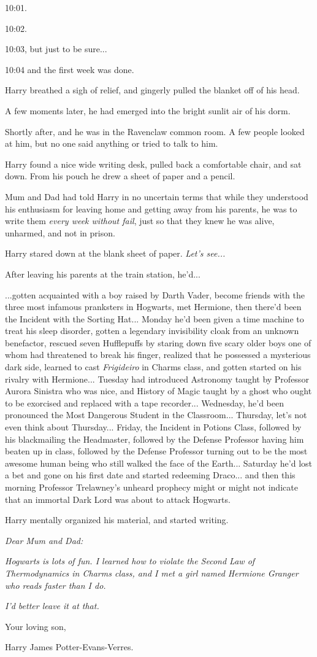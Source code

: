 10:01.

10:02.

10:03, but just to be sure...

10:04 and the first week was done.

Harry breathed a sigh of relief, and gingerly pulled the blanket off of
his head.

A few moments later, he had emerged into the bright sunlit air of his
dorm.

Shortly after, and he was in the Ravenclaw common room. A few people
looked at him, but no one said anything or tried to talk to him.

Harry found a nice wide writing desk, pulled back a comfortable chair,
and sat down. From his pouch he drew a sheet of paper and a pencil.

Mum and Dad had told Harry in no uncertain terms that while they
understood his enthusiasm for leaving home and getting away from his
parents, he was to write them \emph{every week without fail}, just so
that they knew he was alive, unharmed, and not in prison.

Harry stared down at the blank sheet of paper. \emph{Let's see...}

After leaving his parents at the train station, he'd...

...gotten acquainted with a boy raised by Darth Vader, become
friends with the three most infamous pranksters in Hogwarts, met
Hermione, then there'd been the Incident with the Sorting Hat...
Monday he'd been given a time machine to treat his sleep disorder,
gotten a legendary invisibility cloak from an unknown benefactor,
rescued seven Hufflepuffs by staring down five scary older boys one of
whom had threatened to break his finger, realized that he possessed a
mysterious dark side, learned to cast \emph{Frigideiro} in Charms class,
and gotten started on his rivalry with Hermione... Tuesday had
introduced Astronomy taught by Professor Aurora Sinistra who was nice,
and History of Magic taught by a ghost who ought to be exorcised and
replaced with a tape recorder... Wednesday, he'd been pronounced
the Most Dangerous Student in the Classroom... Thursday, let's not
even think about Thursday... Friday, the Incident in Potions Class,
followed by his blackmailing the Headmaster, followed by the Defense
Professor having him beaten up in class, followed by the Defense
Professor turning out to be the most awesome human being who still
walked the face of the Earth... Saturday he'd lost a bet and gone
on his first date and started redeeming Draco... and then this
morning Professor Trelawney's unheard prophecy might or might not
indicate that an immortal Dark Lord was about to attack Hogwarts.

Harry mentally organized his material, and started writing.

\emph{Dear Mum and Dad:}

\emph{Hogwarts is lots of fun. I learned how to violate the Second Law
of Thermodynamics in Charms class, and I met a girl named Hermione
Granger who reads faster than I do.}

\emph{I'd better leave it at that.}

Your loving son,

Harry James Potter-Evans-Verres.
